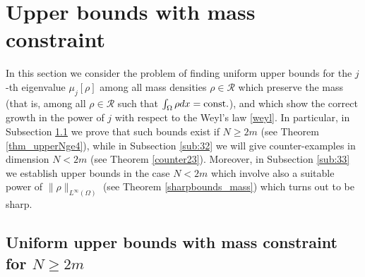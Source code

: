 \documentclass[11pt,a4paper]{amsart}
\numberwithin{equation}{section}
\begin{document}





\section{Upper bounds with mass constraint}\label{MASS}

In this section we consider the problem of finding uniform upper bounds for the $j$-th eigenvalue $\mu_j[\rho]$ among all mass densities $\rho\in\mathcal R$ which preserve the mass (that is, among all $\rho\in\mathcal R$ such that $\int_{\Omega}\rho dx={\rm const.}$), and which show the correct growth in the power of $j$ with respect to the Weyl's law \eqref{weyl}. In particular, in Subsection \ref{sub:31} we prove that such bounds exist if $N\geq 2m$ (see Theorem \ref{thm_upperNge4}), while in Subsection \ref{sub:32} we will give counter-examples in dimension $N<2m$ (see Theorem \ref{counter23}). Moreover, in Subsection \ref{sub:33} we establish upper bounds in the case $N<2m$ which involve also a suitable power of $\|\rho\|_{L^{\infty}(\Omega)}$ (see Theorem \ref{sharpbounds_mass}) which turns out to be sharp.










\subsection{Uniform upper bounds with mass constraint for \texorpdfstring{$N\geq 2m$}{N>=2m}}\label{sub:31}
\end{document}

